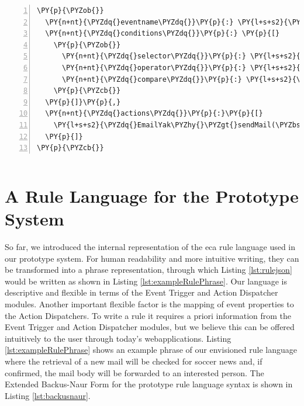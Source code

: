 \begin{Verbatim}[samepage=true,frame=single,fontsize=\footnotesize,commandchars=\\\{\},numbers=left,firstnumber=1,stepnumber=1,xleftmargin
=.3in]
\PY{p}{\PYZob{}}
  \PY{n+nt}{\PYZdq{}eventname\PYZdq{}}\PY{p}{:} \PY{l+s+s2}{\PYZdq{}news\PYZdq{}}\PY{p}{,}
  \PY{n+nt}{\PYZdq{}conditions\PYZdq{}}\PY{p}{:} \PY{p}{[}
    \PY{p}{\PYZob{}}
      \PY{n+nt}{\PYZdq{}selector\PYZdq{}}\PY{p}{:} \PY{l+s+s2}{\PYZdq{}.categories\PYZdq{}}\PY{p}{,}
      \PY{n+nt}{\PYZdq{}operator\PYZdq{}}\PY{p}{:} \PY{l+s+s2}{\PYZdq{}instr\PYZdq{}}\PY{p}{,}
      \PY{n+nt}{\PYZdq{}compare\PYZdq{}}\PY{p}{:} \PY{l+s+s2}{\PYZdq{}soccer\PYZdq{}}
    \PY{p}{\PYZcb{}}
  \PY{p}{]}\PY{p}{,}
  \PY{n+nt}{\PYZdq{}actions\PYZdq{}}\PY{p}{:}\PY{p}{[}
    \PY{l+s+s2}{\PYZdq{}EmailYak\PYZhy{}\PYZgt{}sendMail(\PYZbs{}\PYZdq{}fan@soccer.com\PYZbs{}\PYZdq{},\PYZbs{}\PYZdq{}News about soccer!\PYZbs{}\PYZdq{},\PYZbs{}\PYZdq{}\PYZsh{}\PYZob{} .body \PYZcb{}\PYZbs{}\PYZdq{})\PYZdq{}}
  \PY{p}{]}
\PY{p}{\PYZcb{}}
\end{Verbatim}
\vspace{-0.7cm}
\begin{lstlisting}[float=h,frame=no,label=lst:rulejson,caption=Rule Example expressed in \textrm{\acrshort{json}} Format]
\end{lstlisting}

\section{A Rule Language for the Prototype System}
So far, we introduced the internal representation of the \textrm{\acrshort{eca}} rule language used in our prototype system.
For human readability and more intuitive writing, they can be transformed into a phrase representation, through which Listing \ref{lst:rulejson} would be written as shown in Listing \ref{lst:exampleRulePhrase}.
Our language is descriptive and flexible in terms of the \textrm{Event Trigger} and \textrm{Action Dispatcher} modules.
Another important flexible factor is the mapping of event properties to the \textrm{Action Dispatchers}.
To write a rule it requires a priori information from the \textrm{Event Trigger} and \textrm{Action Dispatcher} modules, but we believe this can be offered intuitively to the user through today's \textrm{\glspl{webapplication}}.
Listing \ref{lst:exampleRulePhrase} shows an example phrase of our envisioned rule language where the retrieval of a new mail will be checked for soccer news and, if confirmed, the mail body will be forwarded to an interested person.
The Extended Backus-Naur Form for the prototype rule language syntax is shown in Listing \ref{lst:backusnaur}.

